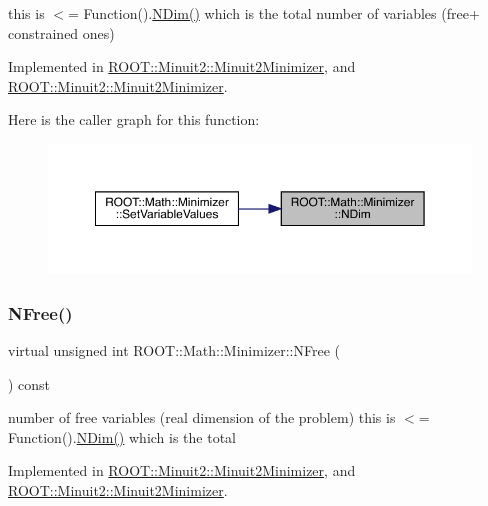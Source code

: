 this is $<$= Function().\mbox{\hyperlink{classROOT_1_1Math_1_1Minimizer_aecb9b9ee5c6a9fd7db3196ae3ac5e335}{N\+Dim()}} which is the total number of variables (free+ constrained ones) 

Implemented in \mbox{\hyperlink{classROOT_1_1Minuit2_1_1Minuit2Minimizer_a6ed2c7d99296e222f0f43295e302eb9e}{R\+O\+O\+T\+::\+Minuit2\+::\+Minuit2\+Minimizer}}, and \mbox{\hyperlink{classROOT_1_1Minuit2_1_1Minuit2Minimizer_a6ed2c7d99296e222f0f43295e302eb9e}{R\+O\+O\+T\+::\+Minuit2\+::\+Minuit2\+Minimizer}}.

Here is the caller graph for this function\+:\nopagebreak
\begin{figure}[H]
\begin{center}
\leavevmode
\includegraphics[width=350pt]{dc/dc4/classROOT_1_1Math_1_1Minimizer_aecb9b9ee5c6a9fd7db3196ae3ac5e335_icgraph}
\end{center}
\end{figure}
\mbox{\label{classROOT_1_1Math_1_1Minimizer_a75a7cd8dc0d764ecc9d82dd8f83aab24}} 
\subsubsection{\texorpdfstring{NFree()}{NFree()}\hspace{0.1cm}{\footnotesize\ttfamily [1/2]}}
{\footnotesize\ttfamily virtual unsigned int R\+O\+O\+T\+::\+Math\+::\+Minimizer\+::\+N\+Free (\begin{DoxyParamCaption}{ }\end{DoxyParamCaption}) const\hspace{0.3cm}{\ttfamily [pure virtual]}}

number of free variables (real dimension of the problem) this is $<$= Function().\mbox{\hyperlink{classROOT_1_1Math_1_1Minimizer_aecb9b9ee5c6a9fd7db3196ae3ac5e335}{N\+Dim()}} which is the total 

Implemented in \mbox{\hyperlink{classROOT_1_1Minuit2_1_1Minuit2Minimizer_a0aa136c5a94d1e5c6bfcbfb98da7ad2d}{R\+O\+O\+T\+::\+Minuit2\+::\+Minuit2\+Minimizer}}, and \mbox{\hyperlink{classROOT_1_1Minuit2_1_1Minuit2Minimizer_a0aa136c5a94d1e5c6bfcbfb98da7ad2d}{R\+O\+O\+T\+::\+Minuit2\+::\+Minuit2\+Minimizer}}.

